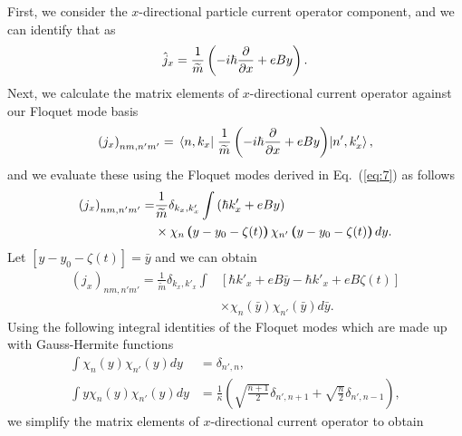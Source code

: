 \documentclass[
 reprint,
 amsmath,amssymb,
 aps,
 prb,
]{revtex4-2}
\begin{document}
{First, we consider the $x$-directional particle current operator component, and we can identify that as
\begin{equation} \label{eq:d4}
  \hat{j}_x = \frac{1}{\widetilde{m}} \left(-i\hbar\pdv{x} + eBy \right).
\end{equation}
Next, we calculate the matrix elements of $x$-directional current operator against our Floquet mode basis
\begin{equation} \label{eq:d5}
  \left({j}_x \right)_{nm,n'm'} =
  \mel{n,k_x}{\;\frac{1}{\widetilde{m}} \left(-i\hbar\pdv{x} + eBy \right)}{n',k'_x},
\end{equation}
and we evaluate these using the Floquet modes derived in Eq.~(\ref{eq:7}) as follows
\begin{equation} \label{eq:d6}
  \begin{aligned}
    \left({j}_x \right)_{nm,n'm'} = &
    \frac{1}{{\widetilde{m}}}
    \delta_{k_x,k'_x}
    \int
    \left(\hbar k'_x + eBy\right) \\
    & \times
     \chi_{n}\bm{\left(}y - y_0 - \zeta(t)\bm{\right)}
    \chi_{n'}\bm{\left(}y - y_0 - \zeta(t)\bm{\right)}
    dy.
  \end{aligned}
\end{equation}
Let $[y - y_0 - \zeta(t)] = \bar{y}$ and we can obtain
\begin{equation} \label{eq:d7}
  \begin{aligned}
    \left({j}_x \right)_{nm,n'm'} =
    \frac{1}{{\widetilde{m}}}
    \delta_{k_x,k'_x}
    \int &
    \left[ \hbar k'_x + eB\bar{y} -\hbar k'_x + eB\zeta(t)\right] \\
    & \times
    \chi_{n}(\bar{y})
    \chi_{n'}(\bar{y})
    d\bar{y}.
  \end{aligned}
\end{equation}
Using the following integral identities of the Floquet modes which are made up with Gauss-Hermite functions \cite{vedenyapin11,szego59,boyd18}
\begin{subequations} \label{eq:d8}
  \begin{align}
    \int
    \chi_{n}({y})
    \chi_{n'}({y}) d{y} &=
    \delta_{n',n}, \\
    \int
    y \chi_{n}({y})\chi_{n'}({y}) d{y} &=
    \frac{1}{\kappa}
    \left(\sqrt{\frac{n+1}{2}} \delta_{n',n+1} + \sqrt{\frac{n}{2}}
    \delta_{n',n-1} \right),
  \end{align}
\end{subequations}
we simplify the matrix elements of $x$-directional current operator to obtain
}
\end{document}
